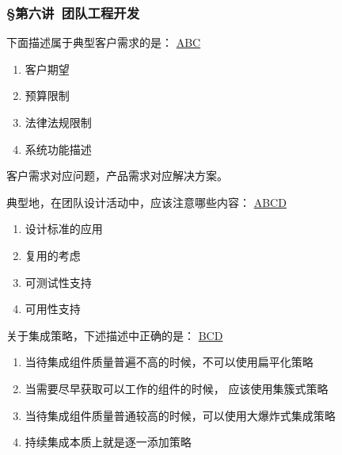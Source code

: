\subsubsection*{\S 第六讲\ 团队工程开发}
\setcounter{problemname}{0}

\begin{problem}
	下面描述属于典型客户需求的是： 
	\uline{ABC}    
    \vspace{-0.8em}
    \begin{multicols}{4}
        \begin{enumerate}[label=\Alph*.]
            \item 客户期望
            \item 预算限制
            \item 法律法规限制
            \item 系统功能描述
        \end{enumerate}
    \end{multicols}
    \vspace{-1em}
\end{problem}

\begin{solution}
客户需求对应问题，产品需求对应解决方案。
\end{solution}



\begin{problem}
	典型地，在团队设计活动中，应该注意哪些内容：
	\uline{ABCD}    
    \vspace{-0.8em}
    \begin{multicols}{4}
        \begin{enumerate}[label=\Alph*.]
            \item 设计标准的应用
            \item 复用的考虑
            \item 可测试性支持
            \item 可用性支持
        \end{enumerate}
    \end{multicols}
    \vspace{-1em}
\end{problem}




\begin{problem}
	关于集成策略，下述描述中正确的是： 
	\uline{BCD}    
        \begin{enumerate}[label=\Alph*.]
            \item 当待集成组件质量普遍不高的时候，不可以使用扁平化策略
            \item 当需要尽早获取可以工作的组件的时候， 应该使用集簇式策略
            \item 当待集成组件质量普通较高的时候，可以使用大爆炸式集成策略
            \item 持续集成本质上就是逐一添加策略
        \end{enumerate}
\end{problem}





